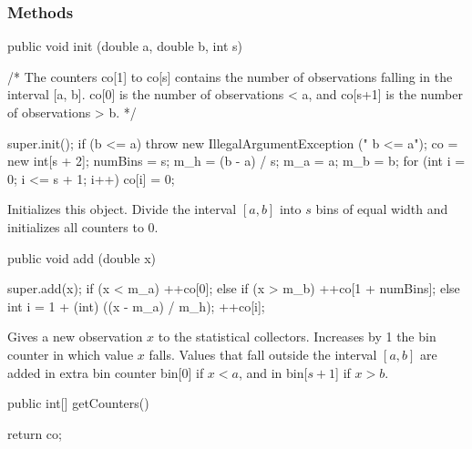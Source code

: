 \subsubsection* {Methods}
\begin{code}

   public void init (double a, double b, int s) \begin{hide} {
      /* The counters co[1] to co[s] contains the number of observations
         falling in the interval [a, b].
         co[0] is the number of observations < a,
         and co[s+1] is the number of observations > b.
      */

      super.init();
      if (b <= a)
         throw new IllegalArgumentException ("   b <= a");
      co = new int[s + 2];
      numBins = s;
      m_h = (b - a) / s;
      m_a = a;
      m_b = b;
      for (int i = 0; i <= s + 1; i++)
         co[i] = 0;
   } \end{hide}
\end{code}
\begin{tabb}  Initializes this object.
Divide the interval $[a,b]$ into $s$ bins of equal width and initializes
all counters to 0.
\end{tabb}
\begin{htmlonly}
\end{htmlonly}
\begin{code}

   public void add (double x) \begin{hide} {
      super.add(x);
      if (x < m_a)
        ++co[0];
      else if (x > m_b)
        ++co[1 + numBins];
      else {
         int i = 1 + (int) ((x - m_a) / m_h);
         ++co[i];
      }
   }\end{hide}
\end{code}
\begin{tabb} Gives a new observation $x$ to the statistical collectors.
Increases by 1 the bin counter in which value $x$ falls.
Values that fall outside the interval $[a,b]$ are added in extra bin
counter bin[0] if $x < a$, and in bin[$s+1$] if $x > b$.
\end{tabb}
\begin{htmlonly}
\end{htmlonly}
\begin{code}

   public int[] getCounters() \begin{hide} {
      return co;
   }\end{hide}
\end{code}
